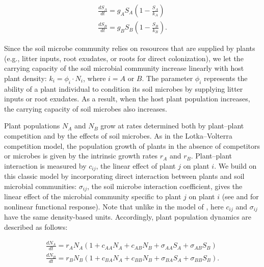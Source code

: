 \begin{align}
\frac{dS_{A}}{dt} = g_{A}S_{A}\left ( 1-\frac{S_{A}}{k_{A}}\right )
\tag{1}\label{eq:SoilA}\\[30pt]
\frac{dS_{B}}{dt} = g_{B}S_{B}\left ( 1-\frac{S_{B}}{k_{B}}\right ) .
\tag{2}\label{eq:SoilB}
\end{align}

\noindent Since the soil microbe community relies on resources that are supplied by plants (e.g., litter inputs, root exudates, or roots for direct colonization), we let the carrying capacity of the soil microbial community increase linearly with host plant density: $k_{i} = \phi_{i} \cdot N_{i}$, where $i = A$ or $B$. The parameter $\phi_{i}$ represents the ability of a plant individual to condition its soil microbes by supplying litter inputs or root exudates. As a result, when the host plant population increases, the carrying capacity of soil microbes also increases.
\par


Plant populations $N_{A}$ and $N_{B}$ grow at rates determined both by plant--plant competition and by the effects of soil microbes. As in the Lotka--Volterra competition model, the population growth of plants in the absence of competitors or microbes is given by the intrinsic growth rates $r_{A}$ and $r_{B}$. Plant--plant interaction is measured by $c_{ij}$, the linear effect of plant $j$ on plant $i$. We build on this classic model by incorporating direct interaction between plants and soil microbial communities: $\sigma_{ij}$, the soil microbe interaction coefficient, gives the linear effect of the microbial community specific to plant $j$ on plant $i$ (see \citealp{Eppinga2006} and \citealp{Aguilera2011} for nonlinear functional response). Note that unlike in the model of \citet{Bever2003}, here $c_{ij}$ and $\sigma_{ij}$ have the same density-based units. Accordingly, plant population dynamics are described as follows:

\begin{align}
\frac{dN_{A}}{dt} = r_{A}N_{A} \left( 1 + c_{AA}N_{A}+c_{AB}N_{B} + \sigma_{AA}S_{A}+\sigma_{AB}S_{B} \right)
\tag{3}\label{eq:Na} \\[30pt]
\frac{dN_{B}}{dt} = r_{B}N_{B} \left( 1 + c_{BA}N_{A}+c_{BB}N_{B} + \sigma_{BA}S_{A}+\sigma_{BB}S_{B} \right) .
\tag{4}\label{eq:Nb}
\end{align}

